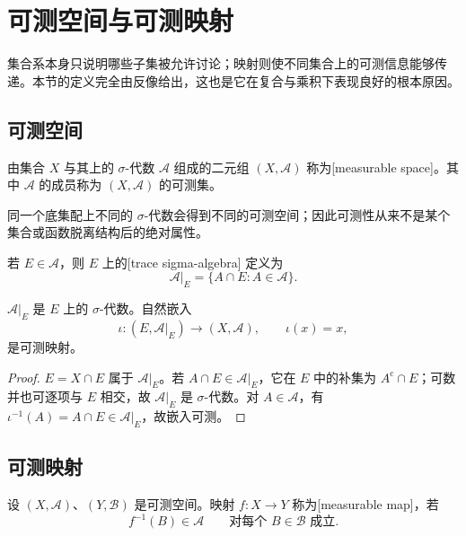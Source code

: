 \section{可测空间与可测映射}
\label{b1:sec:0104}

集合系本身只说明哪些子集被允许讨论；映射则使不同集合上的可测信息能够传递。本节的定义完全由反像给出，这也是它在复合与乘积下表现良好的根本原因。

\subsection{可测空间}
\label{b1:subsec:010401}

\begin{definition}
\label{b1:def:measurable-space}
由集合 \(X\) 与其上的 \(\sigma\)-代数 \(\mathcal A\) 组成的二元组 \((X,\mathcal A)\) 称为[measurable space]。其中 \(\mathcal A\) 的成员称为 \((X,\mathcal A)\) 的可测集。
\end{definition}

同一个底集配上不同的 \(\sigma\)-代数会得到不同的可测空间；因此可测性从来不是某个集合或函数脱离结构后的绝对属性。

\begin{definition}
\label{b1:def:trace-sigma}
若 \(E\in\mathcal A\)，则 \(E\) 上的[trace sigma-algebra] 定义为
\[
\mathcal A|_E=\{A\cap E:A\in\mathcal A\}.
\]
\end{definition}

\begin{proposition}
\label{b1:prop:trace-sigma}
\(\mathcal A|_E\) 是 \(E\) 上的 \(\sigma\)-代数。自然嵌入
\[
\iota:(E,\mathcal A|_E)\longrightarrow(X,\mathcal A),
\qquad
\iota(x)=x,
\]
是可测映射。
\end{proposition}
\begin{proof}
\(E=X\cap E\) 属于 \(\mathcal A|_E\)。若 \(A\cap E\in\mathcal A|_E\)，它在 \(E\) 中的补集为 \(A^{\mathrm c}\cap E\)；可数并也可逐项与 \(E\) 相交，故 \(\mathcal A|_E\) 是 \(\sigma\)-代数。对 \(A\in\mathcal A\)，有 \(\iota^{-1}(A)=A\cap E\in\mathcal A|_E\)，故嵌入可测。
\end{proof}

\subsection{可测映射}
\label{b1:subsec:010402}

\begin{definition}
\label{b1:def:measurable-map}
设 \((X,\mathcal A)\)、\((Y,\mathcal B)\) 是可测空间。映射 \(f:X\to Y\) 称为[measurable map]，若
\[
f^{-1}(B)\in\mathcal A
\qquad
\text{对每个 }B\in\mathcal B\text{ 成立}.
\]
\end{definition}

